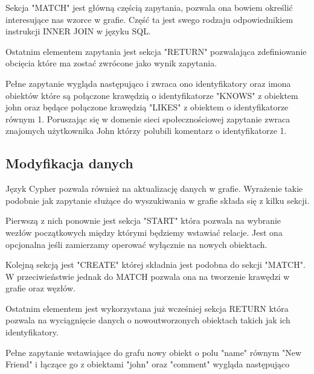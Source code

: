\documentclass[brudnopis]{xmgr}
\begin{document}


Sekcja "MATCH" jest główną częścią zapytania, pozwala ona bowiem określić interesujące nas wzorce w grafie. Część ta jest swego rodzaju odpowiednikiem instrukcji INNER JOIN w języku SQL.



Ostatnim elementem zapytania jest sekcja "RETURN" pozwalająca zdefiniowanie obcięcia które ma zostać zwrócone jako wynik zapytania.



Pełne zapytanie wygląda następująco i zwraca ono identyfikatory oraz imona obiektów które są połączone krawędzią o identyfikatorze "KNOWS" z obiektem john oraz będące połączone krawędzią "LIKES" z obiektem o identyfikatorze równym 1. Poruszając się w domenie sieci społecznościowej zapytanie zwraca znajomych użytkownika John którzy polubili komentarz o identyfikatorze 1.



\subsection{Modyfikacja danych}

Język Cypher pozwala również na aktualizację danych w grafie. Wyrażenie takie podobnie jak zapytanie służące do wyszukiwania w grafie składa się z kilku sekcji.

Pierwszą z nich ponownie jest sekcja "START" która pozwala na wybranie wezłów początkowych między którymi będziemy wstawiać relacje. Jest ona opcjonalna jeśli zamierzamy operować wyłącznie na nowych obiektach.



Kolejną sekcją jest "CREATE" której składnia jest podobna do sekcji "MATCH". W przeciwieństwie jednak do MATCH pozwala ona na tworzenie krawędzi w grafie oraz węzłów.



Ostatnim elementem jest wykorzystana już wcześniej sekcja RETURN która pozwala na wyciągnięcie danych o nowoutworzonych obiektach takich jak ich identyfikatory.



Pełne zapytanie wstawiające do grafu nowy obiekt o polu "name" równym "New Friend" i łączące go z obiektami "john" oraz "comment" wygląda następująco
\end{document}
